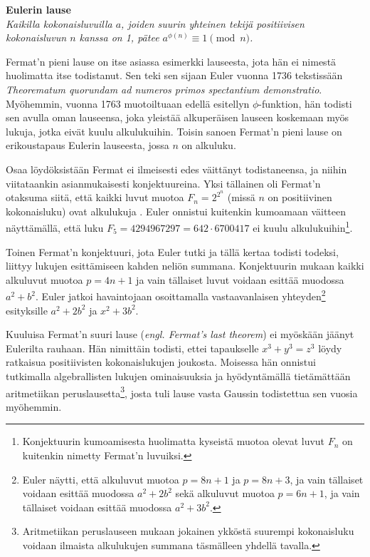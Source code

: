 \documentclass[a4paper,11pt]{article}
\begin{document}
\begin{center}
    \textbf{Eulerin lause}\\
    \textit{Kaikilla kokonaisluvuilla $a$, joiden suurin yhteinen tekijä positiivisen kokonaisluvun $n$ kanssa on 1, pätee $a^{\phi(n)}\equiv 1 \pmod{n}$.}
\end{center}

Fermat'n pieni lause on itse asiassa esimerkki lauseesta, jota hän ei nimestä huolimatta itse todistanut. Sen teki sen sijaan Euler vuonna 1736 tekstissään \textit{Theorematum quorundam ad numeros primos spectantium demonstratio}. Myöhemmin, vuonna 1763 muotoiltuaan edellä esitellyn $\phi$-funktion, hän todisti sen avulla oman lauseensa, joka yleistää alkuperäisen lauseen koskemaan myös lukuja, jotka eivät kuulu alkulukuihin. Toisin sanoen Fermat'n pieni lause on erikoustapaus Eulerin lauseesta, jossa $n$ on alkuluku.

Osaa löydöksistään Fermat ei ilmeisesti edes väittänyt todistaneensa, ja niihin viitataankin asianmukaisesti konjektuureina. Yksi tällainen oli Fermat'n otaksuma siitä, että kaikki luvut muotoa $F_n=2^{2^n}$ (missä $n$ on positiivinen kokonaisluku) ovat alkulukuja \cite{Karatsuba}. Euler onnistui kuitenkin kumoamaan väitteen näyttämällä, että luku $F_5=4294967297=642\cdot 6700417$ ei kuulu alkulukuihin\footnote{Konjektuurin kumoamisesta huolimatta kyseistä muotoa olevat luvut $F_n$ on kuitenkin nimetty Fermat'n luvuiksi.\cite{Karatsuba}}.

Toinen Fermat'n konjektuuri, jota Euler tutki ja tällä kertaa todisti todeksi, liittyy lukujen esittämiseen kahden neliön summana. Konjektuurin mukaan kaikki alkuluvut muotoa $p=4n+1$ ja vain tällaiset luvut voidaan esittää muodossa $a^2+b^2$. Euler jatkoi havaintojaan osoittamalla vastaavanlaisen yhteyden\footnote{Euler näytti, että alkuluvut muotoa $p=8n+1$ ja $p=8n+3$, ja vain tällaiset voidaan esittää muodossa $a^2+2b^2$ sekä alkuluvut muotoa $p=6n+1$, ja vain tällaiset voidaan esittää muodossa $a^2+3b^2$.} esityksille $a^2+2b^2$ ja $x^2+3b^2$.

Kuuluisa Fermat'n suuri lause (\textit{engl. Fermat's last theorem}) ei myöskään jäänyt Eulerilta rauhaan. Hän nimittäin todisti, ettei tapaukselle $x^3+y^3=z^3$ löydy ratkaisua positiivisten kokonaislukujen joukosta. Moisessa hän onnistui tutkimalla algebrallisten lukujen ominaisuuksia ja hyödyntämällä tietämättään aritmetiikan peruslausetta\footnote{Aritmetiikan peruslauseen mukaan jokainen ykköstä suurempi kokonaisluku voidaan ilmaista alkulukujen summana täsmälleen yhdellä tavalla.}, josta tuli lause vasta Gaussin todistettua sen vuosia myöhemmin.
\end{document}
